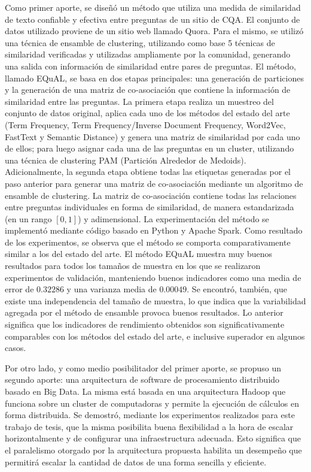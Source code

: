 \bigskip Como primer aporte, se diseñó un método que utiliza una medida de similaridad de texto confiable y efectiva entre preguntas de un sitio de CQA. El conjunto de datos utilizado proviene de un sitio web llamado Quora. Para el mismo, se utilizó una técnica de ensamble de clustering, utilizando como base 5 técnicas de similaridad verificadas y utilizadas ampliamente por la comunidad, generando una salida con información de similaridad entre pares de preguntas. El método, llamado EQuAL, se basa en dos etapas principales: una generación de particiones y la generación de una matriz de co-asociación que contiene la información de similaridad entre las preguntas. La primera etapa realiza un muestreo del conjunto de datos original, aplica cada uno de los métodos del estado del arte (Term Frequency, Term Frequency/Inverse Document Frequency, Word2Vec, FastText y Semantic Distance) y genera una matriz de similaridad por cada uno de ellos; para luego asignar cada una de las preguntas en un cluster, utilizando una técnica de clustering PAM (Partición Alrededor de Medoids). Adicionalmente, la segunda etapa obtiene todas las etiquetas generadas por el paso anterior para generar una matriz de co-asociación mediante un algoritmo de ensamble de clustering. La matriz de co-asociación contiene todas las relaciones entre preguntas individuales en forma de similaridad, de manera estandarizada (en un rango \([0,1]\)) y adimensional. La experimentación del método se implementó mediante código basado en Python y Apache Spark. Como resultado de los experimentos, se observa que el método se comporta comparativamente similar a los del estado del arte. El método EQuAL muestra muy buenos resultados para todos los tamaños de muestra en los que se realizaron experimentos de validación,  manteniendo buenos indicadores como una media de error de \(0.32286\) y una varianza media de \(0.00049\). Se encontró, también, que existe una independencia del tamaño de muestra, lo que indica que la variabilidad agregada por el método de ensamble provoca buenos resultados. Lo anterior significa que los indicadores de rendimiento obtenidos son significativamente comparables con los métodos del estado del arte, e inclusive superador en algunos casos.

\bigskip Por otro lado, y como medio posibilitador del primer aporte, se propuso un segundo aporte: una arquitectura de software de procesamiento distribuido basado en Big Data. La misma está basada en una arquitectura Hadoop que funciona sobre un cluster de computadoras y permite la ejecución de cálculos en forma distribuida. Se demostró, mediante los experimentos realizados para este trabajo de tesis, que la misma posibilita buena flexibilidad a la hora de escalar horizontalmente y de configurar una infraestructura adecuada. Esto significa que el paralelismo otorgado por la arquitectura propuesta habilita un desempeño que permitirá escalar la cantidad de datos de una forma sencilla y eficiente.

